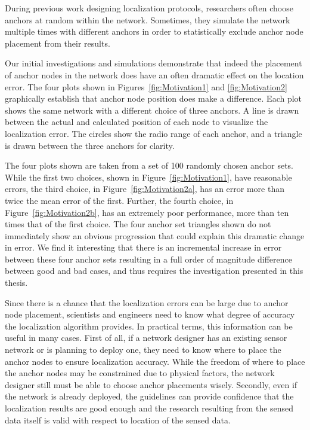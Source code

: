 During previous work designing localization protocols, researchers often choose anchors at random within the network\cite[p.11]{CCA-MAP09}\cite[p.2]{MDS-MAP}.  Sometimes, they simulate the network multiple times with different anchors in order to statistically exclude anchor node placement from their results.

Our initial investigations and simulations demonstrate that indeed the placement of anchor nodes in the network does have an often dramatic effect on the location error.  The four plots shown in Figures~\ref{fig:Motivation1} and \ref{fig:Motivation2} graphically establish that anchor node position does make a difference.  Each plot shows the same network with a different choice of three anchors.  A line is drawn between the actual and calculated position of each node to visualize the localization error.  The circles show the radio range of each anchor, and a triangle is drawn between the three anchors for clarity.  

The four plots shown are taken from a set of 100 randomly chosen anchor sets.  While the first two choices, shown in Figure~\ref{fig:Motivation1}, have reasonable errors, the third choice, in Figure~\ref{fig:Motivation2a}, has an error more than twice the mean error of the first.  Further, the fourth choice, in Figure~\ref{fig:Motivation2b}, has an extremely poor performance, more than ten times that of the first choice.  The four anchor set triangles shown do not immediately show an obvious progression that could explain this dramatic change in error. We find it interesting that there is an incremental increase in error between these four anchor sets resulting in a full order of magnitude difference between good and bad cases, and thus requires the investigation presented in this thesis.

Since there is a chance that the localization errors can be large due to anchor node placement, scientists and engineers need to know what degree of accuracy the localization algorithm provides.  In practical terms, this information can be useful in many cases. First of all, if a network designer has an existing sensor network or is planning to deploy one, they need to know where to place the anchor nodes to ensure localization accuracy.  While the freedom of where to place the anchor nodes may be constrained due to physical factors, the network designer still must be able to choose anchor placements wisely. Secondly, even if the network is already deployed, the guidelines can provide confidence that the localization results are good enough and the research resulting from the sensed data itself is valid with respect to location of the sensed data. 

